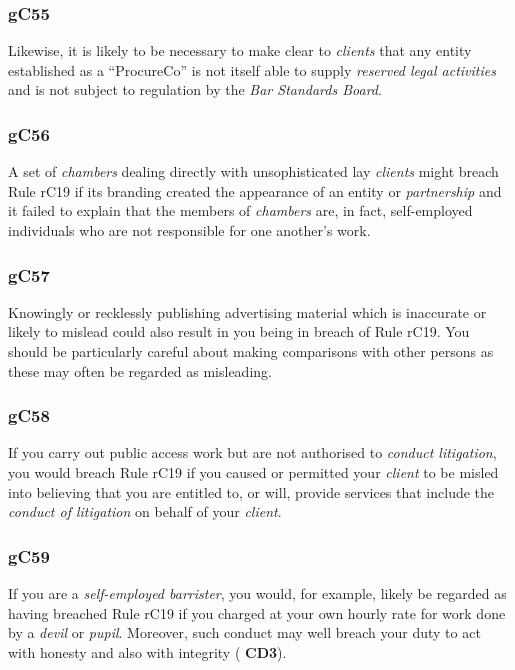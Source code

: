 \subsubsection{\color{darkgrey}gC55}

Likewise, it is likely to be necessary to make clear to \emph{clients}
that any entity established as a ``ProcureCo'' is not itself able to
supply \emph{reserved legal activities} and is not subject to regulation
by the \emph{Bar Standards Board}.

\subsubsection{\color{darkgrey}gC56}

A set of \emph{chambers} dealing directly with unsophisticated lay
\emph{clients} might breach Rule rC19 if its branding created the
appearance of an entity or \emph{partnership} and it failed to explain
that the members of \emph{chambers} are, in fact, self-employed
individuals who are not responsible for one another's work.

\subsubsection{\color{darkgrey}gC57}

Knowingly or recklessly publishing advertising material which is
inaccurate or likely to mislead could also result in you being in breach
of Rule rC19. You should be particularly careful about making
comparisons with other persons as these may often be regarded as
misleading.

\subsubsection{\color{darkgrey}gC58}

If you carry out public access work but are not authorised to
\emph{conduct litigation}, you would breach Rule rC19 if you caused or
permitted your \emph{client} to be misled into believing that you are
entitled to, or will, provide services that include the \emph{conduct of
litigation} on behalf of your \emph{client}.

\subsubsection{\color{darkgrey}gC59}

If you are a \emph{self-employed barrister}, you would, for example,
likely be regarded as having breached Rule rC19 if you charged at your
own hourly rate for work done by a \emph{devil} or \emph{pupil}.
Moreover, such conduct may well breach your duty to act with honesty and
also with integrity ( \textbf{\textcolor{mygold}{CD3}}).

